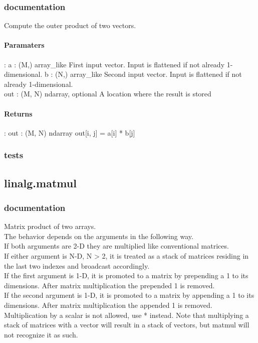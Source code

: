 \documentclass[a4paper,11pt]{article}
\begin{document}
\subsubsection{documentation}
Compute the outer product of two vectors.

\paragraph{Paramaters}: 
a : (M,) array\_like
First input vector. Input is flattened if not already 1-dimensional.
b : (N,) array\_like
Second input vector. Input is flattened if not already 1-dimensional.\\
out : (M, N) ndarray, optional
A location where the result is stored\\
\paragraph{Returns}:    
out : (M, N) ndarray
out[i, j] = a[i] * b[j]

\subsubsection{tests}

\subsection{linalg.matmul}
\subsubsection{documentation}
Matrix product of two arrays.\\

The behavior depends on the arguments in the following way.\\

If both arguments are 2-D they are multiplied like conventional matrices.\\
If either argument is N-D, N > 2, it is treated as a stack of matrices residing in the last two indexes and broadcast accordingly.\\
If the first argument is 1-D, it is promoted to a matrix by prepending a 1 to its dimensions. After matrix multiplication the prepended 1 is removed.\\
If the second argument is 1-D, it is promoted to a matrix by appending a 1 to its dimensions. After matrix multiplication the appended 1 is removed.\\
Multiplication by a scalar is not allowed, use * instead. Note that multiplying a stack of matrices with a vector will result in a stack of vectors, but matmul will not recognize it as such.\\
\end{document}

